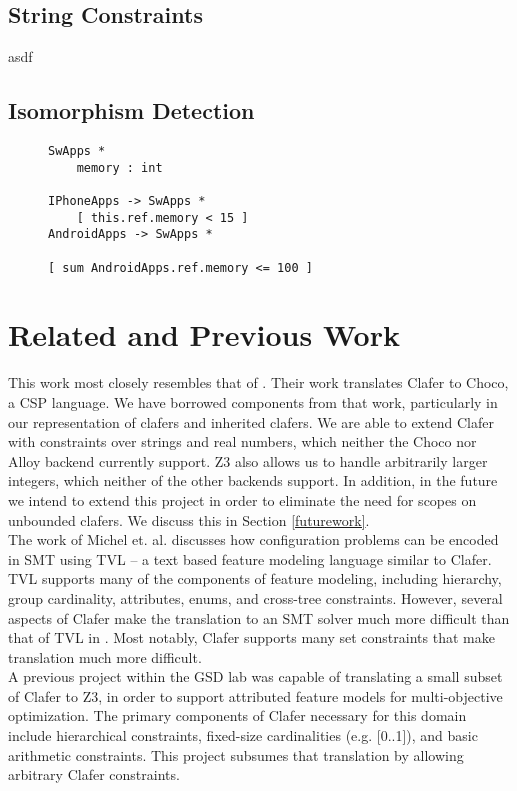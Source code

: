 \documentclass{easychair}
\begin{document}
\subsection{String Constraints}
asdf

\subsection{Isomorphism Detection}
\label{isomorphism}
\begin{figure}[!t]
\centering
\begin{lstlisting}[language=clafer, caption=A more complex mobile phone specification in clafer., label={listing:ClaferMoreComplexSpec}, xleftmargin=.2\textwidth, xrightmargin=.2\textwidth]
SwApps *
	memory : int

IPhoneApps -> SwApps *	
	[ this.ref.memory < 15 ]
AndroidApps -> SwApps *

[ sum AndroidApps.ref.memory <= 100 ]	
\end{lstlisting}%
\end{figure}


\section{Related and Previous Work}
This work most closely resembles that of \cite{jimmy}. Their work translates Clafer to Choco, a CSP language. We have borrowed components from that work, particularly in our representation of clafers and inherited clafers. We are able to extend Clafer with constraints over strings and real numbers, which neither the Choco nor Alloy backend currently support. Z3 also allows us to handle arbitrarily larger integers, which neither of the other backends support. In addition, in the future we intend to extend this project in order to eliminate the need for scopes on unbounded clafers. We discuss this in Section \ref{futurework}. \\
\indent The work of Michel et. al. \cite{Michel2012} discusses how configuration problems can be encoded in SMT using TVL \cite{Classen2011} -- a text based feature modeling language similar to Clafer. TVL supports many of the components of feature modeling, including hierarchy, group cardinality, attributes, enums, and cross-tree constraints. However, several aspects of Clafer make the translation to an SMT solver much more difficult than that of TVL in \cite{Michel2012}. Most notably, Clafer supports many set constraints that make translation much more difficult. \\
\indent  A previous project \cite{Olaechea2013} within the GSD lab was capable of translating a small subset of Clafer to Z3, in order to support attributed feature models for multi-objective optimization. The primary components of Clafer necessary for this domain include hierarchical constraints, fixed-size cardinalities (e.g. [0..1]), and basic arithmetic constraints. This project subsumes that translation by allowing arbitrary Clafer constraints.
\end{document}
